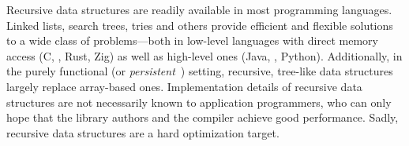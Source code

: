 


Recursive data structures are
readily available in most programming languages. Linked lists, search trees, tries and others
provide efficient and flexible solutions to a wide class of problems---both in low-level languages with direct
memory access (C, \cpp, Rust, Zig) as well as high-level ones (Java, \csharp, Python).
Additionally, in the purely functional (or {\em persistent}~\cite{okasaki}) setting, recursive,
tree-like data structures largely replace array-based ones.
%
Implementation details of recursive data structures are not necessarily known to
application programmers, 
who can only hope that the library authors and the
compiler
achieve good performance.
Sadly, recursive data structures are a hard optimization target.

